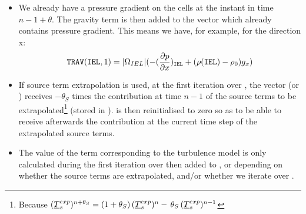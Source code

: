 \begin{itemize}
\item We already have a pressure gradient on the cells at the instant in time $n-1+\theta$. The gravity term is then added to the vector  which already contains pressure gradient. This means we have, for example, for the direction x:
\begin{equation}
\text{\texttt{TRAV}}(\text{\texttt{IEL}},1) = |\Omega_{IEL}| (-\displaystyle (\frac {\partial p}
{\partial x})_{\text{\texttt{IEL}}}+(\rho(\text{\texttt{IEL}})-\rho_0)g_x)
\end{equation}

\item If source term extrapolation is used, at the first iteration over , the vector  (or ) receives $-\theta_S$ times the contribution at time $n-1$ of the source terms to be extrapolated\footnote{Because
$(\underline{T}_s^{exp})^{n+\theta_S}=(1+\theta_S)\,(\underline{T}_s^{exp})^n
-\,\theta_S\, (\underline{T}_s^{exp})^{n-1}$} (stored in ).  is then reinitialised to zero so as to be able to receive afterwards the contribution at the current time step of the extrapolated source terms.

\item The value of the term corresponding to the turbulence model is only calculated during the first iteration over  then added to ,  or  depending on whether the source terms are extrapolated, and/or whether we iterate over .\\


\end{itemize}
